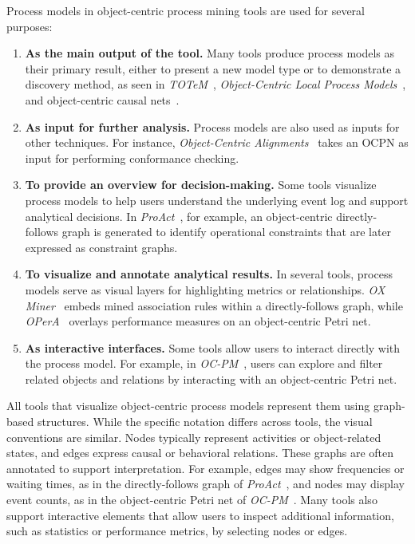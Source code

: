 Process models in object-centric process mining tools are used for several purposes:
\begin{enumerate}[label=\arabic*., leftmargin=1.2cm]
	\item \textbf{As the main output of the tool.}
	      Many tools produce process models as their primary result, either to present a new model type or to demonstrate a discovery method, as seen in \textit{TOTeM}~\cite{totem}, \textit{Object-Centric Local Process Models}~\cite{oclpm}, and object-centric causal nets~\cite{occnet}.

	\item \textbf{As input for further analysis.}
	      Process models are also used as inputs for other techniques. For instance, \textit{Object-Centric Alignments}~\cite{alignments} takes an OCPN as input for performing conformance checking.

	\item \textbf{To provide an overview for decision-making.}
	      Some tools visualize process models to help users understand the underlying event log and support analytical decisions. In \textit{ProAct}~\cite{proact}, for example, an object-centric directly-follows graph is generated to identify operational constraints that are later expressed as constraint graphs.

	\item \textbf{To visualize and annotate analytical results.}
	      In several tools, process models serve as visual layers for highlighting metrics or relationships. \textit{OX Miner}~\cite{oxminer} embeds mined association rules within a directly-follows graph, while \textit{OPerA}~\cite{opera} overlays performance measures on an object-centric Petri net.

	\item \textbf{As interactive interfaces.}
	      Some tools allow users to interact directly with the process model. For example, in \textit{OC-PM}~\cite{ocpm}, users can explore and filter related objects and relations by interacting with an object-centric Petri net.
\end{enumerate}

All tools that visualize object-centric process models represent them using graph-based structures. While the specific notation differs across tools, the visual conventions are similar. Nodes typically represent activities or object-related states, and edges express causal or behavioral relations. These graphs are often annotated to support interpretation. For example, edges may show frequencies or waiting times, as in the directly-follows graph of \textit{ProAct}~\cite{proact}, and nodes may display event counts, as in the object-centric Petri net of \textit{OC-PM}~\cite{ocpm}. Many tools also support interactive elements that allow users to inspect additional information, such as statistics or performance metrics, by selecting nodes or edges.

